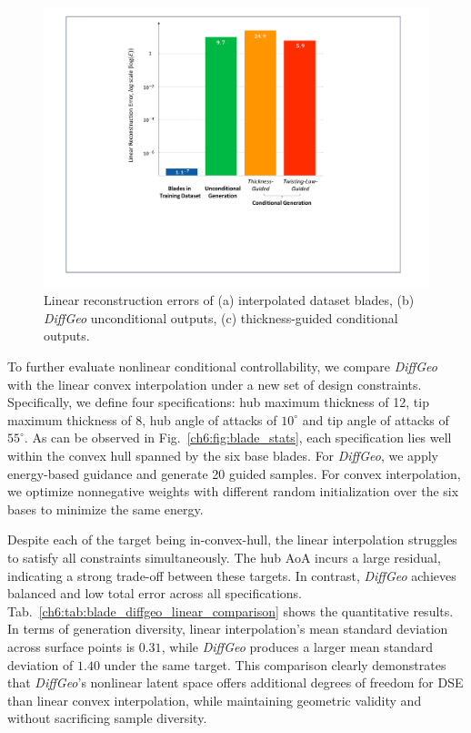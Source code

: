 \begin{figure}[!htb]
    \begin{center}
        \includegraphics[width=1\linewidth]{chapter6/fig/fig_linearity_check.pdf}
    \end{center}
    \caption{
        \small Linear reconstruction errors of (a) interpolated dataset blades, (b) \textit{DiffGeo} unconditional outputs, (c) thickness-guided conditional outputs.
    }
    \label{ch6:fig:linearity_check}
\end{figure}

To further evaluate nonlinear conditional controllability, we compare \textit{DiffGeo} with the linear convex interpolation under a new set of design constraints. Specifically, we define four  specifications: hub maximum thickness of 12, tip maximum thickness of 8, hub angle of attacks of $10^{\circ}$ and tip angle of attacks of $55^{\circ}$. As can be observed in Fig.~\ref{ch6:fig:blade_stats}, each specification lies well within the convex hull spanned by the six base blades. For \textit{DiffGeo}, we apply energy-based guidance and generate 20 guided samples. For convex interpolation, we optimize nonnegative weights with different random initialization over the six bases to minimize the same energy.

Despite each of the target being in-convex-hull, the linear interpolation struggles to satisfy all constraints simultaneously. The hub AoA incurs a large residual, indicating a strong trade-off between these targets. In contrast, \textit{DiffGeo} achieves balanced and low total error across all specifications. Tab.~\ref{ch6:tab:blade_diffgeo_linear_comparison} shows the quantitative results. In terms of generation diversity, linear interpolation's mean standard deviation across surface points is $0.31$, while \textit{DiffGeo} produces a larger mean standard deviation of $1.40$ under the same target. This comparison clearly demonstrates that \textit{DiffGeo}’s nonlinear latent space offers additional degrees of freedom for DSE than linear convex interpolation, while maintaining geometric validity and without sacrificing sample diversity.

